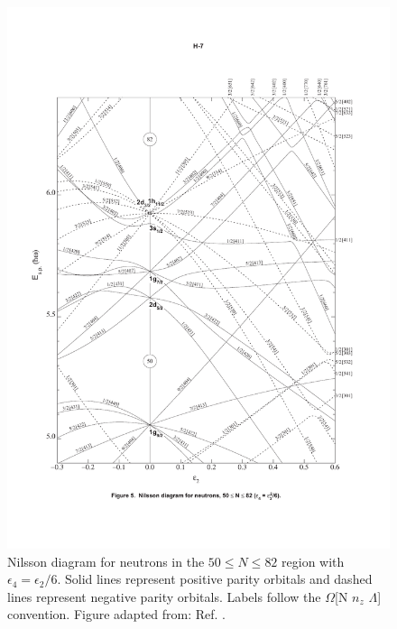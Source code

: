 \begin{figure}[h!]
\centerline{\includegraphics[height=0.8\textheight,clip=true,trim=10 100 10 100]{./img/c2/nilsson_neutron_diagram.pdf}}
	\caption{Nilsson diagram for neutrons in the $50\leq N \leq 82$ region with $\epsilon_4=\epsilon_2/6$. Solid lines represent positive parity orbitals and dashed lines represent negative parity orbitals. Labels follow the $\Omega$[N $n_z$ $\Lambda$] convention. Figure adapted from: Ref. \cite{nilssonDiagrams}.\label{fig:chp2-nillson-neutrons}}
\end{figure}

